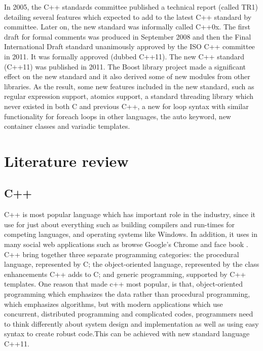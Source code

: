 \documentclass[12pt,a4paper]{report}
\begin{document}
\newline
In 2005, the C++ standards committee published a technical report (called TR1) detailing several features which expected to add to the latest C++ standard by committee. Later on, the new standard was informally called C++0x.  The first draft for formal comments was produced in September 2008 and then the Final International Draft standard unanimously approved by the ISO C++ committee in 2011. It was formally approved (dubbed C++11)\cite{CplusplusHistoryofCpp}.
\newline
The new C++ standard (C++11) was published in 2011. The Boost library project made a significant effect on the new standard and it also derived some of new modules from other libraries. As the result, some new features included in the new standard, such as regular expression support, atomics support, a standard threading library which never existed in both C and previous C++, a new for loop syntax with similar functionality for foreach loops in other languages, the auto keyword, new container classes and variadic templates\cite{CplusplusHistoryofCpp}. 

\newpage


\chapter{Literature review}

\section{C++}
\label{section: C++}
C++ is most popular language which has important role in the industry, since it use for just about everything such as building compilers and run-times for competing languages, and operating systems like Windows. In addition, it uses in many social web applications such as browse Google’s Chrome and face book \cite{ISO:2011:Cpplanguage}.
\newline
C++ bring together three separate programming categories: the procedural language, represented by C; the object-oriented language, represented by the class enhancements C++ adds to C; and generic programming, supported by C++ templates\cite{Prata:2012:Cpp}.
\newline
One reason that made c++ most popular, is that, object-oriented programming which emphasizes the data rather than procedural programming, which emphasizes algorithms, but with modern applications which use concurrent, distributed programming and complicated codes, programmers need to think differently about system design and implementation as well as using easy syntax  to create robust code.This can be achieved with new standard language C++11\cite{Stroustrup:2012:Cpp11}.
\end{document}
